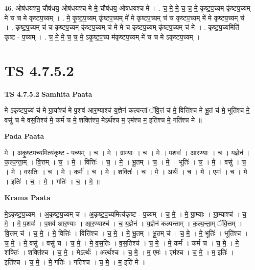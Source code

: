 \documentclass[17pt]{extarticle}
\begin{document}
46. ओष॑धयश्च॒ चौष॑धय॒ ओष॑धयश्च मे मे॒ चौष॑धय॒ ओष॑धयश्च मे । . च॒ मे॒ मे॒ च॒ च॒ मे॒ कृ॒ष्ट॒प॒च्यम् कृ॑ष्टप॒च्यम् मे॑ च च मे कृष्टप॒च्यम् । . मे॒ कृ॒ष्ट॒प॒च्यम् कृ॑ष्टप॒च्यम् मे॑ मे कृष्टप॒च्यम् च॑ च कृष्टप॒च्यम् मे॑ मे कृष्टप॒च्यम् च॑ । . कृ॒ष्ट॒प॒च्यम् च॑ च कृष्टप॒च्यम् कृ॑ष्टप॒च्यम् च॑ मे मे च कृष्टप॒च्यम् कृ॑ष्टप॒च्यम् च॑ मे । . कृ॒ष्ट॒प॒च्यमिति॑ कृष्ट - प॒च्यम् । . च॒ मे॒ मे॒ च॒ च॒ मे॒ ऽकृ॒ष्ट॒प॒च्य म॑कृष्टप॒च्यम् मे॑ च च मे ऽकृष्टप॒च्यम् । \newline
\pagebreak
{}

\section{ TS 4.7.5.2 }

\textbf{TS 4.7.5.2 } \newline
\textbf{Samhita Paata} \newline

मे ऽकृष्टप॒च्यं च॑ मे ग्रा॒यांश्च॑ मे प॒शव॑ आर॒ण्याश्च॑ य॒ज्ञेन॑ कल्पन्तां ॅवि॒त्तं च॑ मे॒ वित्ति॑श्च मे भू॒तं च॑ मे॒ भूति॑श्च मे॒ वसु॑ च मे वस॒तिश्च॑ मे॒ कर्म॑ च मे॒ शक्ति॑श्च॒ मेऽर्थ॑श्च म॒ एम॑श्च म॒ इति॑श्च मे॒ गति॑श्च मे ॥ \newline

\textbf{Pada Paata} \newline

मे॒ । अ॒कृ॒ष्ट॒प॒च्यमित्य॑कृष्ट - प॒च्यम् । च॒ । मे॒ । ग्रा॒म्याः । च॒ । मे॒ । प॒शवः॑ । आ॒र॒ण्याः । च॒ । य॒ज्ञेन॑ । क॒ल्प॒न्ता॒म् । वि॒त्तम् । च॒ । मे॒ । वित्तिः॑ । च॒ । मे॒ । भू॒तम् । च॒ । मे॒ । भूतिः॑ । च॒ । मे॒ । वसु॑ । च॒ । मे॒ । व॒स॒तिः । च॒ । मे॒ । कर्म॑ । च॒ । मे॒ । शक्तिः॑ । च॒ । मे॒ । अर्थः॑ । च॒ । मे॒ । एमः॑ । च॒ । मे॒ । इतिः॑ । च॒ । मे॒ । गतिः॑ । च॒ । मे॒ ॥  \newline


\textbf{Krama Paata} \newline

मे॒ऽकृ॒ष्ट॒प॒च्यम् । अ॒कृ॒ष्ट॒प॒च्यम् च॑ । अ॒कृ॒ष्ट॒प॒च्यमित्य॑कृष्ट - प॒च्यम् । च॒ मे॒ । मे॒ ग्रा॒म्याः । ग्रा॒म्याश्च॑ । च॒ मे॒ । मे॒ प॒शवः॑ । प॒शव॑ आर॒ण्याः । आ॒र॒ण्याश्च॑ । च॒ य॒ज्ञेन॑ । य॒ज्ञेन॑ कल्पन्ताम् । क॒ल्प॒न्ता॒म् ॅवि॒त्तम् । वि॒त्तम् च॑ । च॒ मे॒ । मे॒ वित्तिः॑ । वित्ति॑श्च । च॒ मे॒ । मे॒ भू॒तम् । भू॒तम् च॑ । च॒ मे॒ । मे॒ भूतिः॑ । भूति॑श्च । च॒ मे॒ । मे॒ वसु॑ । वसु॑ च । च॒ मे॒ । मे॒ व॒स॒तिः । व॒स॒तिश्च॑ । च॒ मे॒ । मे॒ कर्म॑ । कर्म॑ च । च॒ मे॒ । मे॒ शक्तिः॑ । शक्ति॑श्च । च॒ मे॒ । मेऽर्त्थः॑ । अर्त्थ॑श्च । च॒ मे॒ । म॒ एमः॑ । एम॑श्च । च॒ मे॒ । म॒ इतिः॑ । इति॑श्च । च॒ मे॒ । मे॒ गतिः॑ । गति॑श्च । च॒ मे॒ । म॒ इति॑ मे । \newline
\end{document}
